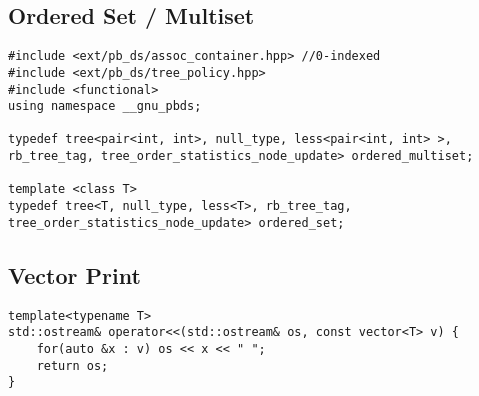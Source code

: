 \documentclass[8pt, headheight=10pt]{scrartcl}
\begin{document}
\begin{multicols*}{3}
\subsection{Ordered Set / Multiset}
\begin{lstlisting}
#include <ext/pb_ds/assoc_container.hpp> //0-indexed
#include <ext/pb_ds/tree_policy.hpp>
#include <functional>
using namespace __gnu_pbds;

typedef tree<pair<int, int>, null_type, less<pair<int, int> >, rb_tree_tag, tree_order_statistics_node_update> ordered_multiset;

template <class T>
typedef tree<T, null_type, less<T>, rb_tree_tag, tree_order_statistics_node_update> ordered_set;
\end{lstlisting}

\subsection{Vector Print}
\begin{lstlisting}
template<typename T>
std::ostream& operator<<(std::ostream& os, const vector<T> v) {
    for(auto &x : v) os << x << " ";
    return os;
}
\end{lstlisting}

\end{multicols*}
\end{document}
